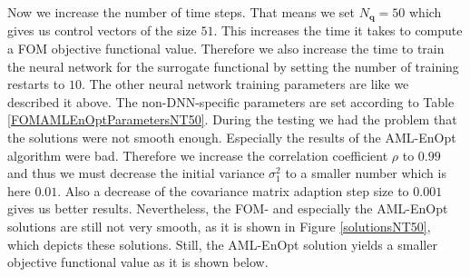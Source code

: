 Now we increase the number of time steps. That means we set $N_\mathbf{q}=50$ which gives us control vectors of the size $51$. This increases the time it takes to compute a FOM objective functional value. Therefore we also increase the time to train the neural network for the surrogate functional by setting the number of training restarts to $10$. The other neural network training parameters are like we described it above. The non-DNN-specific parameters are set according to Table \ref{FOMAMLEnOptParametersNT50}. During the testing we had the problem that the solutions were not smooth enough. Especially the results of the AML-EnOpt algorithm were bad. Therefore we increase the correlation coefficient $\rho$ to $0.99$ and thus we must decrease the initial variance $\sigma^2_1$ to a smaller number which is here $0.01$. Also a decrease of the covariance matrix adaption step size to $0.001$ gives us better results. Nevertheless, the FOM- and especially the AML-EnOpt solutions are still not very smooth, as it is shown in Figure \ref{solutionsNT50}, which depicts these solutions. Still, the AML-EnOpt solution yields a smaller objective functional value as it is shown below.

